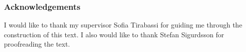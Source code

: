 

\begin{center}
	\item\subsubsection*{Acknowledgements}
\end{center}
	
	
	I would like to thank my supervisor Sofia Tirabassi for guiding me through the construction of this text. I also would like to thank Stefan Sigurdsson for proofreading the text.
	


